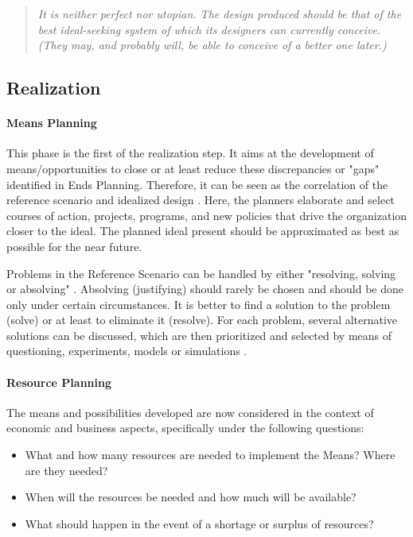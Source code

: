 \documentclass[
a4paper,
12pt
]{scrartcl}
\begin{document}
		\begin{quote}\itshape{\glqq
		It is neither perfect nor utopian. The design produced should be that of the best ideal-seeking system of which its designers can currently conceive. (They may, and probably will, be able to conceive of a better one later.)
		\grqq } \cite{ackoff:2001}
\end{quote}	



	
    \subsection{Realization}
		
	\paragraph{Means Planning} 
	
	This phase is the first of the realization step. It aims at the development of means/opportunities to close or at least reduce these discrepancies or "gaps" identified in Ends Planning.  Therefore, it can be seen as the correlation of the reference scenario and idealized design \cite{lumbo:2007}. Here, the planners elaborate and select courses of action, projects, programs, and new policies that drive the organization closer to the ideal.
	The planned ideal present should be approximated as best as possible for the near future.
	
	Problems in the Reference Scenario can be handled by either "resolving, solving or absolving" \cite{ackoff:1981}. Absolving (justifying) should rarely be chosen and should be done only under certain circumstances.
	It is better to find a solution to the problem (solve) or at least to eliminate it (resolve).  For each problem, several alternative solutions can be discussed, which are then prioritized and selected by means of questioning, experiments, models or simulations \cite{ackoff:1981}.
	
	
	\paragraph{Resource  Planning} 
	
	The means and possibilities developed are now considered in the context of economic and business aspects, specifically under the following questions:
	\begin{itemize}
		\item What  and how many resources are needed to implement the Means? Where are they needed?
		\item When will the resources be needed and how much will be available?
		\item What should happen in the event of a shortage or surplus of resources?
	\end{itemize}
\end{document}
